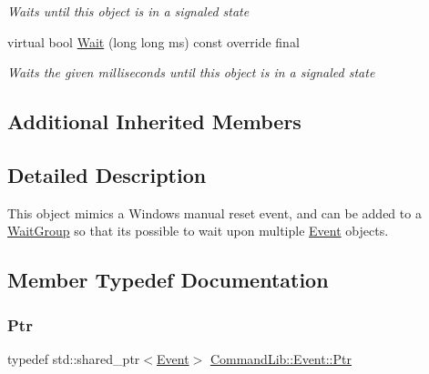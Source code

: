 \begin{DoxyCompactItemize}
\begin{DoxyCompactList}\small\item\em Waits until this object is in a signaled state \end{DoxyCompactList}\item 
\mbox{\label{class_command_lib_1_1_event_a395777fd83828fea3d225b2c192d70dd}} 
virtual bool \mbox{\hyperlink{class_command_lib_1_1_event_a395777fd83828fea3d225b2c192d70dd}{Wait}} (long long ms) const override final
\begin{DoxyCompactList}\small\item\em Waits the given milliseconds until this object is in a signaled state \end{DoxyCompactList}\end{DoxyCompactItemize}
\subsection*{Additional Inherited Members}


\subsection{Detailed Description}
This object mimics a Windows manual reset event, and can be added to a \mbox{\hyperlink{class_command_lib_1_1_wait_group}{Wait\+Group}} so that it\textquotesingle{}s possible to wait upon multiple \mbox{\hyperlink{class_command_lib_1_1_event}{Event}} objects. 



\subsection{Member Typedef Documentation}
\mbox{\label{class_command_lib_1_1_event_a3ac4eb982c0456c1216859a61198c073}} 
\subsubsection{\texorpdfstring{Ptr}{Ptr}}
{\footnotesize\ttfamily typedef std\+::shared\+\_\+ptr$<$\mbox{\hyperlink{class_command_lib_1_1_event}{Event}}$>$ \mbox{\hyperlink{class_command_lib_1_1_event_a3ac4eb982c0456c1216859a61198c073}{Command\+Lib\+::\+Event\+::\+Ptr}}}



